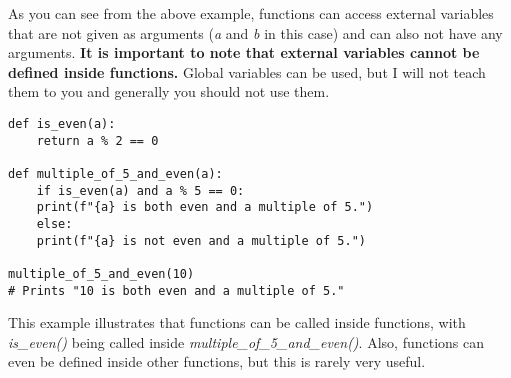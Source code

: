 \documentclass{article}
\begin{document}
As you can see from the above example, functions can access external variables that are not given as arguments (\textit{a} and \textit{b} in this case) and can also not have any arguments. \textbf{It is important to note that external variables cannot be defined inside functions.} Global variables can be used, but I will not teach them to you and generally you should not use them.

\begin{verbatim}
def is_even(a):
    return a % 2 == 0

def multiple_of_5_and_even(a):
    if is_even(a) and a % 5 == 0:
	print(f"{a} is both even and a multiple of 5.")
    else:
	print(f"{a} is not even and a multiple of 5.")

multiple_of_5_and_even(10)
# Prints "10 is both even and a multiple of 5."
\end{verbatim}

This example illustrates that functions can be called inside functions, with \textit{is\_even()} being called inside \textit{multiple\_of\_5\_and\_even()}. Also, functions can even be defined inside other functions, but this is rarely very useful.
\end{document}
